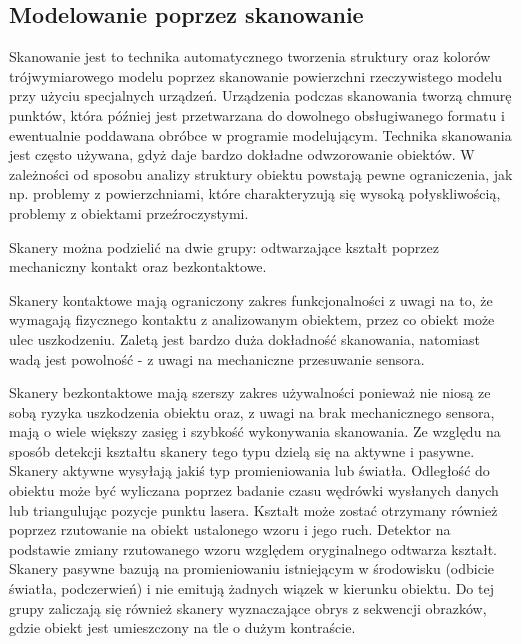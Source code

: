 \subsection{Modelowanie poprzez skanowanie}
Skanowanie jest to technika automatycznego tworzenia struktury oraz kolorów
trójwymiarowego modelu poprzez skanowanie powierzchni rzeczywistego modelu przy
użyciu specjalnych urządzeń. Urządzenia podczas skanowania tworzą chmurę
punktów, która później jest przetwarzana do dowolnego obsługiwanego formatu i
ewentualnie poddawana obróbce w programie modelującym. Technika skanowania jest
często używana, gdyż daje bardzo dokładne odwzorowanie obiektów. W zależności od
sposobu analizy struktury obiektu powstają pewne ograniczenia, jak np. problemy 
z powierzchniami, które charakteryzują się wysoką połyskliwością, problemy z
obiektami przeźroczystymi.

Skanery można podzielić na dwie grupy: odtwarzające kształt poprzez mechaniczny
kontakt oraz bezkontaktowe.

Skanery kontaktowe mają ograniczony zakres funkcjonalności z uwagi na to, że
wymagają fizycznego kontaktu z analizowanym obiektem, przez co obiekt może ulec
uszkodzeniu. Zaletą jest bardzo duża dokładność skanowania, natomiast wadą
jest powolność - z uwagi na mechaniczne przesuwanie sensora.

Skanery bezkontaktowe mają szerszy zakres używalności ponieważ nie niosą ze
sobą ryzyka uszkodzenia obiektu oraz, z uwagi na brak mechanicznego sensora,
mają o wiele większy zasięg i szybkość wykonywania skanowania. Ze względu na
sposób detekcji kształtu skanery tego typu dzielą się na aktywne i pasywne.
Skanery aktywne wysyłają jakiś typ promieniowania lub światła. Odległość do
obiektu może być wyliczana poprzez badanie czasu wędrówki wysłanych danych lub triangulując pozycje punktu lasera. Kształt może zostać
otrzymany również poprzez rzutowanie na obiekt ustalonego wzoru i jego ruch.
Detektor na podstawie zmiany rzutowanego wzoru względem oryginalnego odtwarza
kształt.
Skanery pasywne bazują na promieniowaniu istniejącym w środowisku (odbicie
światła, podczerwień) i nie emitują żadnych wiązek w kierunku obiektu. Do tej
grupy zaliczają się również skanery wyznaczające obrys z sekwencji obrazków,
gdzie obiekt jest umieszczony na tle o dużym kontraście.

